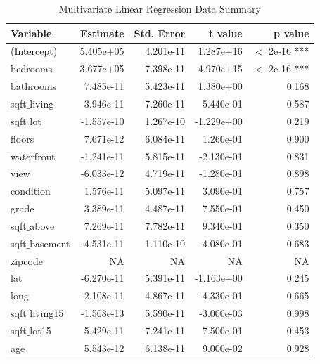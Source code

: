 \documentclass[a4paper, 9pt]{article}
\begin{document}
\begin{table}[ht]
\centering
\begin{tabular}{|l|r|r|r|r|}
\hline
\textbf{Variable} & \textbf{Estimate} & \textbf{Std. Error} & \textbf{t value} & \textbf{p value} \\
\hline
(Intercept)       & 5.405e+05   & 4.201e-11  & 1.287e+16  & $<$ 2e-16 ***  \\
bedrooms          & 3.677e+05   & 7.398e-11  & 4.970e+15  & $<$ 2e-16 ***  \\
bathrooms         & 7.485e-11   & 5.423e-11  & 1.380e+00  & 0.168        \\
sqft$\_$living       & 3.946e-11   & 7.260e-11  & 5.440e-01  & 0.587        \\
sqft$\_$lot          & -1.557e-10  & 1.267e-10  & -1.229e+00 & 0.219        \\
floors            & 7.671e-12   & 6.084e-11  & 1.260e-01  & 0.900        \\
waterfront        & -1.241e-11  & 5.815e-11  & -2.130e-01 & 0.831        \\
view              & -6.033e-12  & 4.719e-11  & -1.280e-01 & 0.898        \\
condition         & 1.576e-11   & 5.097e-11  & 3.090e-01  & 0.757        \\
grade             & 3.389e-11   & 4.487e-11  & 7.550e-01  & 0.450        \\
sqft$\_$above        & 7.269e-11   & 7.782e-11  & 9.340e-01  & 0.350        \\
sqft$\_$basement     & -4.531e-11  & 1.110e-10  & -4.080e-01 & 0.683        \\
zipcode           & NA          & NA         & NA         & NA           \\
lat               & -6.270e-11  & 5.391e-11  & -1.163e+00 & 0.245        \\
long              & -2.108e-11  & 4.867e-11  & -4.330e-01 & 0.665        \\
sqft$\_$living15     & -1.568e-13  & 5.590e-11  & -3.000e-03 & 0.998        \\
sqft$\_$lot15        & 5.429e-11   & 7.241e-11  & 7.500e-01  & 0.453        \\
age               & 5.543e-12   & 6.138e-11  & 9.000e-02  & 0.928        \\
\hline
\end{tabular}
\caption{Multivariate Linear Regression Data Summary}
\label{tab:mlrcoeffs}
\end{table}
\end{document}
